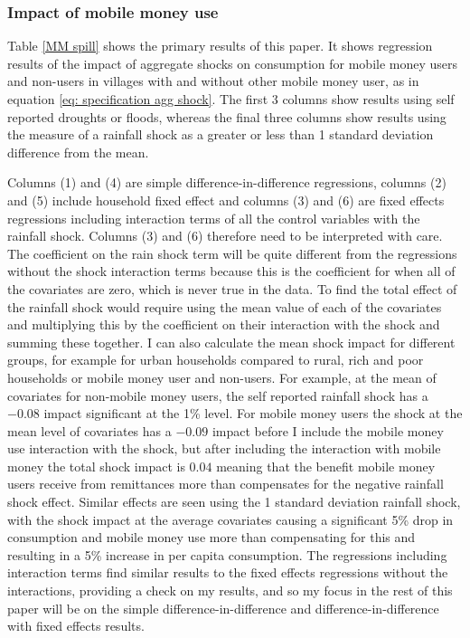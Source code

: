 \subsubsection{Impact of mobile money use}
Table \ref{MM spill} shows the primary results of this paper. It shows regression results of the impact of aggregate shocks on consumption for mobile money users and non-users in villages with and without other mobile money user, as in equation \eqref{eq: specification agg shock}. The first 3 columns show results using self reported droughts or floods, whereas the final three columns show results using the measure of a rainfall shock as a greater or less than 1 standard deviation difference from the mean.     

Columns (1) and (4) are simple difference-in-difference regressions, columns (2) and (5) include household fixed effect  and columns (3) and (6) are fixed effects regressions including interaction terms of all the control variables with the rainfall shock. Columns (3) and (6) therefore need to be interpreted with care. The coefficient on the rain shock term will be quite different from the regressions without the shock interaction terms because this is the coefficient for when all of the covariates are zero, which is never true in the data. To find the total effect of the rainfall shock  would require using the mean value of each of the covariates and multiplying this by the coefficient on their interaction with the shock and summing these together. I can also calculate the mean shock impact for different groups, for example for urban households compared to rural, rich and poor households or mobile money user and non-users. For example, at the mean of covariates for non-mobile money users, the self reported rainfall shock has a $-0.08$ impact significant at the 1\% level. For mobile money users the shock at the mean level of covariates has a $-0.09$ impact before I include the mobile money use interaction with the shock, but after including the interaction with mobile money the total shock impact is $0.04$ meaning that the benefit mobile money users receive from remittances more than compensates for the negative rainfall shock effect.  Similar effects are seen using the 1 standard deviation rainfall shock, with the shock impact at the average covariates causing a significant 5\% drop in consumption and mobile money use more than compensating for this and resulting in a 5\% increase in per capita consumption.  The regressions including interaction terms find similar results to the fixed effects regressions without the interactions, providing a check on my results, and so my focus in the rest of this paper will be on the simple difference-in-difference and difference-in-difference with fixed effects results. 

